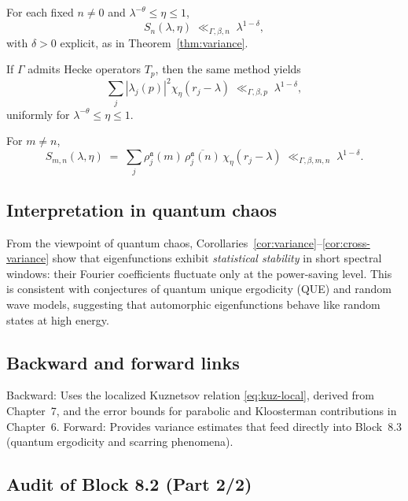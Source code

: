 \begin{corollary}\label{cor:variance}
For each fixed $n\neq 0$ and $\lambda^{-\theta}\le \eta\le 1$,
\[
S_n(\lambda,\eta)\;\ll_{\Gamma,\beta,n}\;\lambda^{1-\delta},
\]
with $\delta>0$ explicit, as in Theorem~\ref{thm:variance}.
\end{corollary}

\begin{corollary}\label{cor:hecke-variance}
If $\Gamma$ admits Hecke operators $T_p$, then the same method yields
\[
\sum_j |\lambda_j(p)|^2 \chi_\eta(r_j-\lambda) \;\ll_{\Gamma,\beta,p}\;\lambda^{1-\delta},
\]
uniformly for $\lambda^{-\theta}\le \eta\le 1$.
\end{corollary}

\begin{corollary}\label{cor:cross-variance}
For $m\neq n$,
\[
S_{m,n}(\lambda,\eta)\;=\;\sum_j \rho_j^\mathfrak{a}(m)\,\overline{\rho_j^\mathfrak{a}(n)}\,\chi_\eta(r_j-\lambda)
\;\ll_{\Gamma,\beta,m,n}\;\lambda^{1-\delta}.
\]
\end{corollary}

\subsection{Interpretation in quantum chaos}
From the viewpoint of quantum chaos, Corollaries~\ref{cor:variance}–\ref{cor:cross-variance} show that eigenfunctions exhibit \emph{statistical stability} in short spectral windows: their Fourier coefficients fluctuate only at the power-saving level. This is consistent with conjectures of quantum unique ergodicity (QUE) and random wave models, suggesting that automorphic eigenfunctions behave like random states at high energy.

\subsection{Backward and forward links}
Backward: Uses the localized Kuznetsov relation \eqref{eq:kuz-local}, derived from Chapter~7, and the error bounds for parabolic and Kloosterman contributions in Chapter~6.  
Forward: Provides variance estimates that feed directly into Block~8.3 (quantum ergodicity and scarring phenomena).  

\subsection{Audit of Block 8.2 (Part 2/2)}
